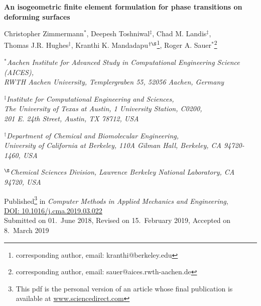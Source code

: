 \documentclass[11pt]{article}
\begin{document}

\begin{center}
\Large{\bf{An isogeometric finite element formulation for phase transitions on deforming surfaces}}\\

\end{center}

\begin{center}
\large{Christopher Zimmermann$^\ast$, Deepesh Toshniwal$^\ddagger$, Chad M. Landis$^\ddagger$, \\[1mm] Thomas J.R. Hughes$^\ddagger$, Kranthi K. Mandadapu$^{\dagger\S}$\footnote{corresponding author, email: kranthi@berkeley.edu}, Roger A. Sauer$^\ast$\footnote{corresponding author, email: sauer@aices.rwth-aachen.de}}
\vspace{4mm}

\small{\textit{$^\ast$Aachen Institute for Advanced Study in Computational Engineering Science (AICES), \\ RWTH Aachen University, Templergraben 55, 52056 Aachen, Germany}}


\small{\textit{$^\ddagger$Institute for Computational Engineering and Sciences,\\ The University of Texas at Austin, 1 University Station, C0200,\\ 201 E. 24th Street, Austin, TX 78712, USA}}

\small{\textit{$^\dagger$Department of Chemical and Biomolecular Engineering,\\ University of California at Berkeley,
110A Gilman Hall, Berkeley, CA 94720-1460, USA}}

\small{\textit{$^\S$Chemical Sciences Division, Lawrence Berkeley National Laboratory, CA 94720, USA}}



\vspace{4mm}

Published\footnote{This pdf is the personal version of an article whose final publication is available at \href{http://dx.doi.org/10.1016/j.cma.2019.03.022}{www.sciencedirect.com}} 
in \textit{Computer Methods in Applied Mechanics and Engineering}, \\
\href{http://dx.doi.org/10.1016/j.cma.2019.03.022}{DOI: 10.1016/j.cma.2019.03.022} \\
Submitted on 01.~June 2018, Revised on 15.~February 2019, Accepted on 8.~March 2019

\end{center}
\end{document}

